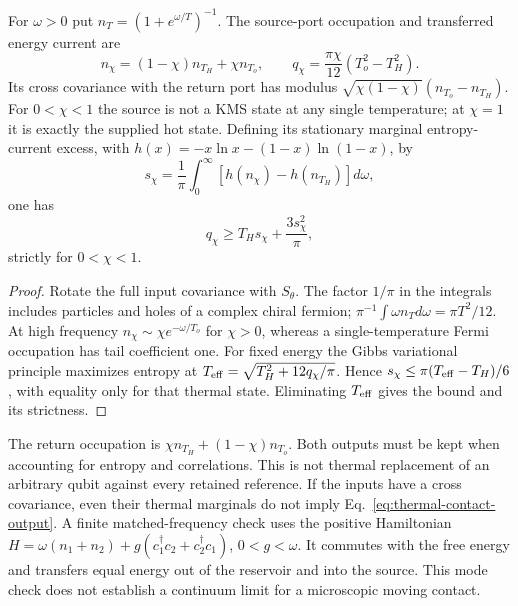 \begin{proposition}
\label{prop:thermal-contact}
For $\omega>0$ put $n_T=(1+e^{\omega/T})^{-1}$. The source-port
occupation and transferred energy current are
\begin{equation}\label{eq:thermal-contact-output}
 n_\chi=(1-\chi)n_{T_H}+\chi n_{T_o},\qquad
 q_\chi=\frac{\pi\chi}{12}(T_o^2-T_H^2).
\end{equation}
Its cross covariance with the return port has modulus
$\sqrt{\chi(1-\chi)}(n_{T_o}-n_{T_H})$. For $0<\chi<1$ the source
is not a KMS state at any single temperature; at $\chi=1$ it is exactly
the supplied hot state. Defining its stationary marginal entropy-current
excess, with $h(x)=-x\ln x-(1-x)\ln(1-x)$, by
\[
 s_\chi=\frac1\pi\int_0^\infty
       [h(n_\chi)-h(n_{T_H})]d\omega,
\]
one has
\begin{equation}\label{eq:contact-entropy-floor}
 q_\chi\ge T_Hs_\chi+\frac{3s_\chi^2}{\pi},
\end{equation}
strictly for $0<\chi<1$.
\end{proposition}
\begin{proof}
Rotate the full input covariance with $S_\theta$. The factor $1/\pi$
in the integrals includes particles and holes of a complex chiral
fermion; $\pi^{-1}\int\omega n_Td\omega=\pi T^2/12$.
At high frequency $n_\chi\sim\chi e^{-\omega/T_o}$ for $\chi>0$,
whereas a single-temperature Fermi occupation has tail coefficient one.
For fixed energy the Gibbs variational principle maximizes entropy at
$T_{\rm eff}=\sqrt{T_H^2+12q_\chi/\pi}$. Hence
$s_\chi\le\pi(T_{\rm eff}-T_H)/6$, with equality only for that thermal
state. Eliminating $T_{\rm eff}$ gives the bound and its strictness.
\end{proof}

The return occupation is $\chi n_{T_H}+(1-\chi)n_{T_o}$. Both outputs
must be kept when accounting for entropy and correlations. This is not
thermal replacement of an arbitrary qubit against every retained
reference. If the inputs have a cross covariance, even their thermal
marginals do not imply Eq.~\eqref{eq:thermal-contact-output}.
A finite matched-frequency check uses the positive Hamiltonian
$H=\omega(n_1+n_2)+g(c_1^\dagger c_2+c_2^\dagger c_1)$, $0<g<\omega$.
It commutes with the free energy and transfers equal energy out of the
reservoir and into the source. This mode check does not establish a
continuum limit for a microscopic moving contact.

